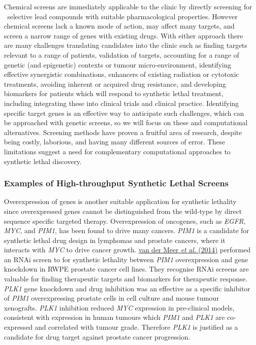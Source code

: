 Chemical screens are immediately applicable to the clinic by directly screening for \ selective lead compounds with suitable pharmacological properties. However chemical screens lack a known mode of action, may affect many targets, and screen a narrow range of genes with existing drugs. With either approach there are many challenges translating candidates into the clinic such as finding targets relevant to a range of patients, validation of targets, accounting for a range of genetic (and epigenetic) contexts or tumour micro-environment, identifying effective synergistic combinations, enhancers of existing radiation or cytotoxic treatments, avoiding inherent or acquired drug resistance, and developing biomarkers for patients which will respond to synthetic lethal treatment, including integrating these into clinical trials and clinical practice. Identifying specific target genes is an effective way to anticipate such challenges, which can be approached with genetic screens, so we will focus on these and computational alternatives. Screening methods have proven a fruitful area of research, despite being costly, laborious, and having many different sources of error. These limitations suggest a need for complementary computational approaches to synthetic lethal discovery.  

\subsubsection[Examples of High{}-throughput Synthetic Lethal Screens]{Examples of High-throughput Synthetic Lethal Screens}

Overexpression of genes is another suitable application for synthetic lethality since overexpressed genes cannot be distinguished from the wild-type by direct sequence specific targeted therapy. Overexpression of oncogenes, such as \textit{EGFR}, \textit{MYC}, and \textit{PIM1}, has been found to drive many cancers. \textit{PIM1} is a candidate for synthetic lethal drug design in lymphomas and prostate cancers, where it interacts with \textit{MYC} to drive cancer growth. \hyperlink{ENREF103}{van der Meer}\hyperlink{ENREF103}{\textit{ et al.}}\hyperlink{ENREF103}{ (2014)} performed an RNAi screen to for synthetic lethality between \textit{PIM1} overexpression and gene knockdown in RWPE prostate cancer cell lines. They recognise RNAi screens are valuable for finding therapeutic targets and biomarkers for therapeutic response. \textit{PLK1} gene knockdown and drug inhibition was an effective as a specific inhibitor of \textit{PIM1} overexpressing prostate cells in cell culture and mouse tumour xenografts. \textit{PLK1} inhibition reduced \textit{MYC} expression in pre-clinical models, consistent with expression in human tumours which \textit{PIM1} and \textit{PLK1} are co-expressed and correlated with tumour grade. Therefore \textit{PLK1} is justified as a candidate for drug target against prostate cancer progression.  

